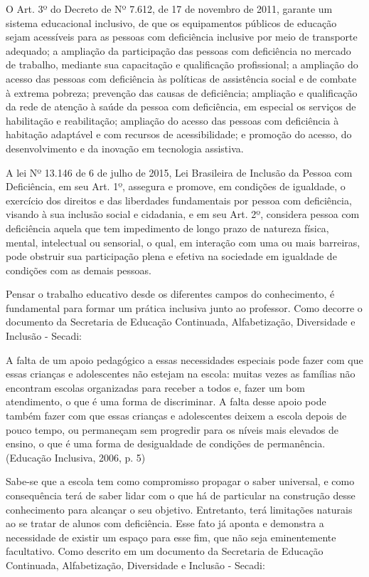 \documentclass[brasil]{abnt}
\begin{document}
	O Art. 3º do Decreto de Nº 7.612, de 17 de novembro de 2011, garante um sistema educacional inclusivo, de que os equipamentos públicos de educação sejam acessíveis para as pessoas com deficiência 
	inclusive por meio de transporte adequado; a ampliação da participação das pessoas com deficiência no mercado de trabalho, mediante sua capacitação e qualificação profissional; a 
	ampliação do acesso das pessoas com deficiência às políticas de assistência social e de combate à extrema pobreza; prevenção das causas de deficiência; ampliação e qualificação da rede de atenção à saúde 
	da pessoa com deficiência, em especial os serviços de habilitação e reabilitação; ampliação do acesso das pessoas com deficiência à habitação adaptável e com recursos de acessibilidade; e promoção do acesso, 
	do desenvolvimento e da inovação em tecnologia assistiva. 
						
	A lei Nº 13.146 de 6 de julho de 2015, Lei Brasileira de Inclusão da Pessoa com Deficiência, em seu Art. 1º, assegura e promove, em condições de igualdade, o exercício dos direitos 
	e das liberdades fundamentais por pessoa com deficiência, visando à sua inclusão social e cidadania, e em seu Art. 2º, considera pessoa com deficiência aquela que tem impedimento de longo prazo de natureza 
	física, mental, intelectual ou sensorial, o qual, em interação com uma ou mais barreiras, pode obstruir sua participação plena e efetiva na sociedade em igualdade de condições com as demais pessoas. 
	
	Pensar o trabalho educativo desde os diferentes campos do conhecimento, é fundamental para formar um prática inclusiva junto ao professor. Como decorre o documento da Secretaria de Educação Continuada, 
	Alfabetização, Diversidade e Inclusão - Secadi:
	
		\begin{citacao} A falta de um apoio pedagógico a essas necessidades especiais pode fazer com que essas crianças e adolescentes não estejam na escola: muitas vezes as famílias não encontram escolas 
						organizadas para receber a todos e, fazer um bom atendimento, o que é uma forma de discriminar. A falta desse apoio pode também fazer com que essas crianças e adolescentes deixem a 
						escola depois de pouco tempo, ou permaneçam sem progredir para os níveis mais elevados de ensino, o que é uma forma de desigualdade de condições de permanência. 
						(Educação Inclusiva, 2006, p. 5)
		\end{citacao}

	Sabe-se que a escola tem como compromisso propagar o saber universal, e como consequência terá de saber lidar com o que há de particular na construção desse conhecimento para alcançar o seu objetivo. 
	Entretanto, terá limitações naturais ao se tratar de alunos com deficiência. Esse fato já aponta e demonstra a necessidade de existir um espaço para esse fim, que não seja eminentemente facultativo.
	Como descrito em um documento da Secretaria de Educação Continuada, Alfabetização, Diversidade e Inclusão - Secadi:
		
\end{document}
